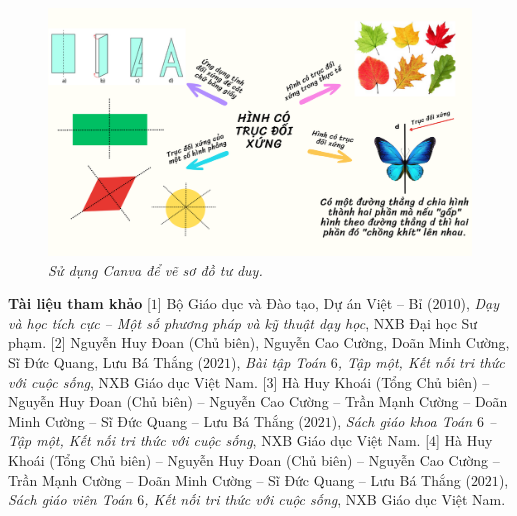 \begin{multicols}{2}
	\begin{figure}[H]
		\vspace*{-5pt}
		\centering
		\captionsetup{labelformat= empty, justification=centering}
		\includegraphics[width= 1\linewidth]{7}
		\caption{\small\textit{\color{diendantoanhoc}Sử dụng Canva để vẽ sơ đồ tư duy.}}
		\vspace*{-10pt}
	\end{figure}
	\textbf{\color{diendantoanhoc}Tài liệu tham khảo}
	\vskip 0.1cm 
	[$1$] Bộ Giáo dục và Đào tạo, Dự án Việt -- Bỉ ($2010$), \textit{Dạy và học tích cực -- Một số phương pháp và kỹ thuật dạy học}, NXB Đại học Sư phạm.
	\vskip 0.1cm
	[$2$] Nguyễn Huy Đoan (Chủ biên), Nguyễn Cao Cường, Doãn Minh Cường, Sĩ Đức Quang, Lưu Bá Thắng ($2021$), \textit{Bài tập Toán $6$, Tập một, Kết nối tri thức với cuộc sống}, NXB Giáo dục Việt Nam.
	\vskip 0.1cm
	[$3$] Hà Huy Khoái (Tổng Chủ biên) -- Nguyễn Huy Đoan (Chủ biên) -- Nguyễn Cao Cường -- Trần Mạnh Cường -- Doãn Minh Cường -- Sĩ Đức Quang -- Lưu Bá Thắng ($2021$), \textit{Sách giáo khoa Toán $6$ -- Tập một, Kết nối tri thức với cuộc sống}, NXB Giáo dục Việt Nam.
	\vskip 0.1cm
	[$4$] Hà Huy Khoái (Tổng Chủ biên) -- Nguyễn Huy Đoan (Chủ biên) -- Nguyễn Cao Cường -- Trần Mạnh Cường -- Doãn Minh Cường -- Sĩ Đức Quang -- Lưu Bá Thắng ($2021$), \textit{Sách giáo viên Toán $6$, Kết nối tri thức với cuộc sống}, NXB Giáo dục Việt Nam.
\end{multicols}
